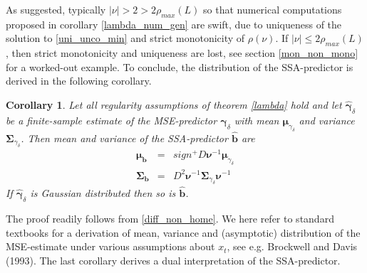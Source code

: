 \documentclass[a4paper]{article}
\newtheorem{Corollary}{Corollary}
\begin{document}
As suggested, typically $|\nu|>2>2\rho_{max}(L)$ so that numerical computations proposed in corollary \ref{lambda_num_gen} are swift, due to uniqueness of the solution to \ref{uni_unco_min} and strict monotonicity of $\rho(\nu)$. If $|\nu|\leq 2\rho_{max}(L)$, then strict monotonicity and uniqueness are lost, see section \ref{mon_non_mono} for a worked-out example. To conclude, the distribution of the SSA-predictor is derived in the following corollary.  


\begin{Corollary}
Let all regularity assumptions of theorem \ref{lambda} hold and let $\hat{\boldsymbol{\gamma}}_{\delta}$ be a finite-sample estimate of the MSE-predictor ${\boldsymbol{\gamma}}_{\delta}$ with mean ${\boldsymbol{\mu}}_{\gamma_\delta}$ and variance ${\boldsymbol{\Sigma}}_{\gamma_\delta}$. Then mean and variance of the SSA-predictor $\hat{\mathbf{b}}$ are
\begin{eqnarray*}
{\boldsymbol{\mu}}_{\mathbf{b}}&=&sign^+D\boldsymbol{\nu}^{-1}{\boldsymbol{\mu}}_{\gamma_\delta}\\
{\boldsymbol{\Sigma}}_{\mathbf{b}}&=&D^2\boldsymbol{\nu}^{-1}{\boldsymbol{\Sigma}}_{\gamma_\delta}\boldsymbol{\nu}^{-1}
\end{eqnarray*}
If $\hat{\boldsymbol{\gamma}}_{\delta}$ is Gaussian distributed then so is $\hat{\mathbf{b}}$. 
\end{Corollary}
The proof readily follows from \ref{diff_non_home}. We here refer to standard textbooks  for a derivation of mean, variance and (asymptotic) distribution of the MSE-estimate under various assumptions about $x_t$, see e.g. Brockwell and Davis (1993). The last corollary derives a dual interpretation of the SSA-predictor.
\end{document}

